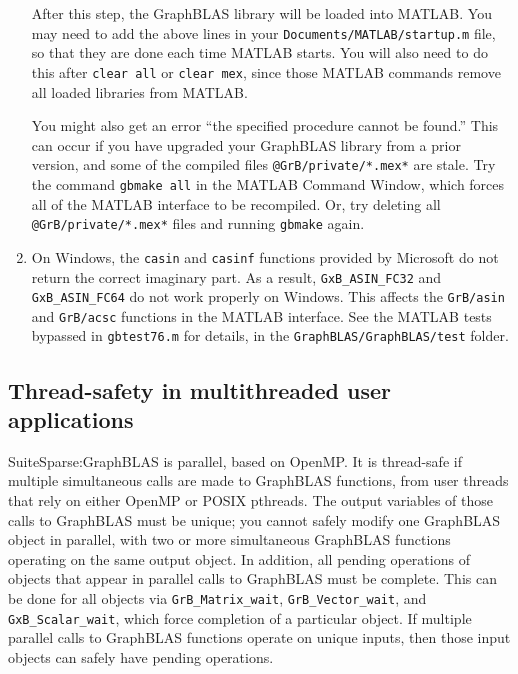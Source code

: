 \documentclass[12pt]{article}
\begin{document}
\begin{enumerate}
    \vspace{-0.1in}
    After this step, the GraphBLAS library will be loaded into MATLAB.  You may
    need to add the above lines in your \verb'Documents/MATLAB/startup.m' file,
    so that they are done each time MATLAB starts.  You will also need to do
    this after \verb'clear all' or \verb'clear mex', since those MATLAB
    commands remove all loaded libraries from MATLAB.

    You might also get an error ``the specified procedure cannot be found.''
    This can occur if you have upgraded your GraphBLAS library from a prior
    version, and some of the compiled files \verb'@GrB/private/*.mex*'
    are stale.  Try the command \verb'gbmake all' in the MATLAB Command
    Window, which forces all of the MATLAB interface to be recompiled.
    Or, try deleting all \verb'@GrB/private/*.mex*' files and running
    \verb'gbmake' again.

\item On Windows, the \verb'casin' and \verb'casinf' functions provided
    by Microsoft do not return the correct imaginary part.  As a result,
    \verb'GxB_ASIN_FC32' and \verb'GxB_ASIN_FC64' do not work properly on
    Windows.  This affects the \verb'GrB/asin' and \verb'GrB/acsc' functions in
    the MATLAB interface.  See the MATLAB tests bypassed in \verb'gbtest76.m'
    for details, in the \newline \verb'GraphBLAS/GraphBLAS/test' folder.

\end{enumerate}

\subsection{Thread-safety in multithreaded user applications}
\label{sec:threads}


SuiteSparse:GraphBLAS is parallel, based on OpenMP.  It is thread-safe if
multiple simultaneous calls are made to GraphBLAS functions, from user threads
that rely on either OpenMP or POSIX pthreads.  The output variables of those
calls to GraphBLAS must be unique; you cannot safely modify one GraphBLAS
object in parallel, with two or more simultaneous GraphBLAS functions operating
on the same output object.  In addition, all pending operations of objects that
appear in parallel calls to GraphBLAS must be complete.  This can be done for
all objects via \verb'GrB_Matrix_wait', \verb'GrB_Vector_wait', and
\verb'GxB_Scalar_wait', which force completion of a particular object.  If
multiple parallel calls to GraphBLAS functions operate on unique inputs, then
those input objects can safely have pending operations.
\end{document}
